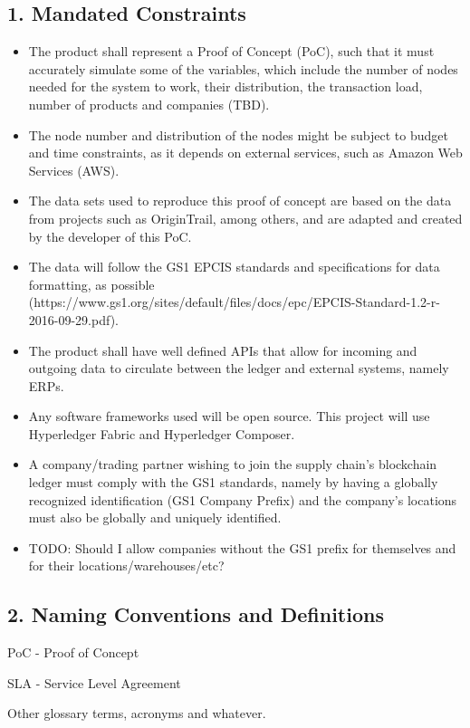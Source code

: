 \subsection*{1. Mandated Constraints}
    \begin{itemize}
		\item The product shall represent a Proof of Concept (PoC), such that it must accurately simulate some of the variables, which include the number of nodes needed for the system to work, their distribution, the transaction load, number of products and companies (TBD).
		\item The node number and distribution of the nodes might be subject to budget and time constraints, as it depends on external services, such as Amazon Web Services (AWS).
		\item The data sets used to reproduce this proof of concept are based on the data from projects such as OriginTrail, among others, and are adapted and created by the developer of this PoC.
		\item The data will follow the GS1 EPCIS standards and specifications for data formatting, as possible (https://www.gs1.org/sites/default/files/docs/epc/EPCIS-Standard-1.2-r-2016-09-29.pdf).
		\item The product shall have well defined APIs that allow for incoming and outgoing data to circulate between the ledger and external systems, namely ERPs.
		\item Any software frameworks used will be open source. This project will use Hyperledger Fabric and Hyperledger Composer.
		\item A company/trading partner wishing to join the supply chain's blockchain ledger must comply with the GS1 standards, namely by having a globally recognized identification (GS1 Company Prefix) and the company's locations must also be globally and uniquely identified.
		\item TODO: Should I allow companies without the GS1 prefix for themselves and for their locations/warehouses/etc? 
        \end{itemize}
        \subsection*{2. Naming Conventions and Definitions}
		\par PoC - Proof of Concept
		\par SLA - Service Level Agreement
		\par Other glossary terms, acronyms and whatever.
		

